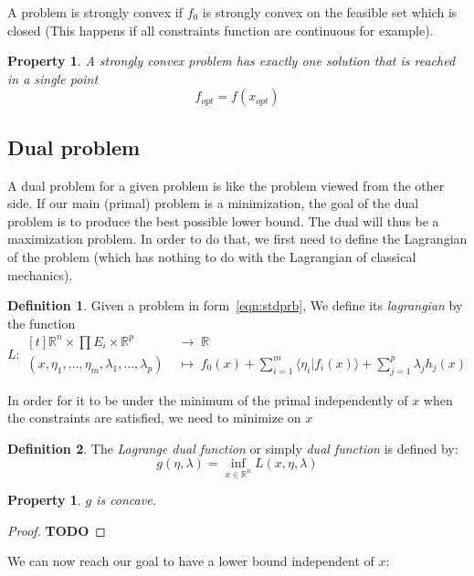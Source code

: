 \documentclass[10pt]{report}
\theoremstyle{plain}
\newtheorem{prop}[thm]{Property}
\theoremstyle{definition}
\newtheorem{defn}{Definition}[chapter]
\theoremstyle{remark}
\newcommand{\R}{\ensuremath{\mathbb{R}}}
\newcommand{\TODO}{\textbf{TODO}}
\newcommand{\braket}[2]{\langle#1|#2\rangle}
\begin{document}
A problem is strongly convex if $f_0$ is strongly convex on the feasible set
which is closed (This happens if all constraints function are continuous for example).

\begin{prop}
  A strongly convex problem has exactly one solution that is reached in a single point
  \[f_{opt} = f(x_{opt})\]
\end{prop}

\subsection{Dual problem}

A dual problem for a given problem is like the problem viewed from the other
side. If our main (primal) problem is a minimization, the goal of the dual
problem is to produce the best possible lower bound. The dual will thus be a
maximization problem. In order to do that, we first
need to define the Lagrangian of the problem (which has nothing to do with the
Lagrangian of classical mechanics).

\begin{defn}
  Given a problem in form~\ref{eqn:stdprb}, We define its \emph{lagrangian} by
  the function
  \[ L:\begin{aligned}[t] \R^n \times \prod E_i \times \R^p \;&\to\; \R\\
      (x,\eta_1,\ldots,\eta_m,\lambda_1,\ldots,\lambda_p) \;&\mapsto\; f_0(x) +
      \sum_{i = 1}^m \braket {\eta_i}{f_i(x)} + \sum_{j = 1}^p \lambda_j h_j(x)
    \end{aligned}
  \]
\end{defn}


In order for it to be under the minimum of the primal independently of $x$ when the constraints are
satisfied, we need to minimize on $x$

\begin{defn}
  The \emph{Lagrange dual function} or simply \emph{dual function} is defined by:
  \[g(\eta,\lambda) = \inf_{x \in \R^n} L(x,\eta,\lambda)\]
\end{defn}

\begin{prop}
  $g$ is concave.
\end{prop}

\begin{proof}
  \TODO{}
\end{proof}

We can now reach our goal to have a lower bound independent of $x$:
\end{document}

